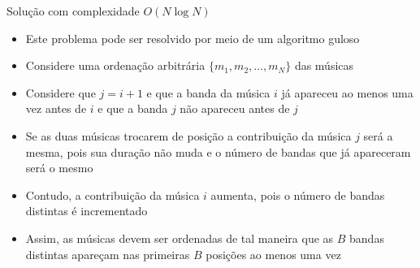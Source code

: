 \begin{frame}[fragile]{Solução com complexidade $O(N\log N)$}

    \begin{itemize}
        \item Este problema pode ser resolvido por meio de um algoritmo guloso

        \item Considere uma ordenação arbitrária $\lbrace m_1, m_2, \ldots, m_N\rbrace$ das
            músicas

        \item Considere que $j = i + 1$ e que a banda da música $i$ já apareceu ao menos uma vez
            antes de $i$ e que a banda $j$ não apareceu antes de $j$

        \item Se as duas músicas trocarem de posição a contribuição da música $j$ será a mesma,
            pois sua duração não muda e o número de bandas que já apareceram será o mesmo

        \item Contudo, a contribuição da música $i$ aumenta, pois o número de bandas distintas
            é incrementado

        \item Assim, as músicas devem ser ordenadas de tal maneira que as $B$ bandas distintas
            apareçam nas primeiras $B$ posições ao menos uma vez
   \end{itemize}

\end{frame}


